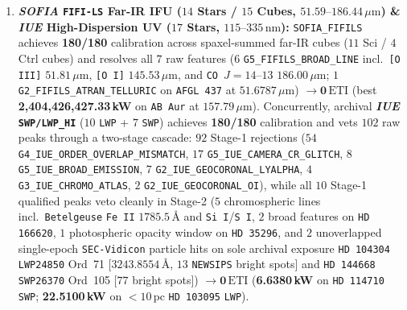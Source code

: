 \documentclass[twocolumn,10pt]{article}
\begin{document}
\begin{enumerate}
  \item \textbf{\textit{SOFIA} \texttt{FIFI-LS} Far-IR IFU ($14$ Stars / $15$ Cubes, $51.59\text{--}186.44\,\mu\text{m}$) \& \textit{IUE} High-Dispersion UV ($17$ Stars, $115\text{--}335\,\text{nm}$):} \texttt{SOFIA\_FIFILS} achieves \textbf{180/180} calibration across spaxel-summed far-IR cubes ($11$ Sci / $4$ Ctrl cubes) and resolves all $7$ raw features ($6$ \texttt{G5\_\allowbreak FIFILS\_\allowbreak BROAD\_\allowbreak LINE} incl.\ \texttt{{[}O III{]}} $51.81\,\mu\text{m}$, \texttt{{[}O I{]}} $145.53\,\mu\text{m}$, and \texttt{CO}\ $J=14\text{--}13$ $186.00\,\mu\text{m}$; $1$ \texttt{G2\_\allowbreak FIFILS\_\allowbreak ATRAN\_\allowbreak TELLURIC} on \texttt{AFGL\,437} at $51.6787\,\mu\text{m}$) $\rightarrow \mathbf{0\,\mathrm{ETI}}$ (best \textbf{2,404,426,427.33\,kW} on \texttt{AB\,Aur} at $157.79\,\mu\text{m}$). Concurrently, archival \textbf{\textit{IUE} \texttt{SWP/LWP\_HI}} ($10$ \texttt{LWP} + $7$ \texttt{SWP}) achieves \textbf{180/180} calibration and vets $102$ raw peaks through a two-stage cascade: $92$ Stage-1 rejections ($54$ \texttt{G4\_\allowbreak IUE\_\allowbreak ORDER\_\allowbreak OVERLAP\_\allowbreak MISMATCH}, $17$ \texttt{G5\_\allowbreak IUE\_\allowbreak CAMERA\_\allowbreak CR\_\allowbreak GLITCH}, $8$ \texttt{G5\_\allowbreak IUE\_\allowbreak BROAD\_\allowbreak EMISSION}, $7$ \texttt{G2\_\allowbreak IUE\_\allowbreak GEOCORONAL\_\allowbreak LYALPHA}, $4$ \texttt{G3\_\allowbreak IUE\_\allowbreak CHROMO\_\allowbreak ATLAS}, $2$ \texttt{G2\_\allowbreak IUE\_\allowbreak GEOCORONAL\_\allowbreak OI}), while all $10$ Stage-1 qualified peaks veto cleanly in Stage-2 ($5$ chromospheric lines incl.\ \texttt{Betelgeuse} \texttt{Fe II} $1785.5\,\text{\AA}$ and \texttt{Si I}/\texttt{S I}, $2$ broad features on \texttt{HD\,166620}, $1$ photospheric opacity window on \texttt{HD\,35296}, and $2$ unoverlapped single-epoch \texttt{SEC-Vidicon} particle hits on sole archival exposure \texttt{HD\,104304} \texttt{LWP24850} Ord~71 [$3243.8554\,\text{\AA}$, $13$ \texttt{NEWSIPS} bright spots] and \texttt{HD\,144668} \texttt{SWP26370} Ord~105 [$77$ bright spots]) $\rightarrow \mathbf{0\,\mathrm{ETI}}$ (\textbf{6.6380\,kW} on \texttt{HD\,114710} \texttt{SWP}; \textbf{22.5100\,kW} on $<10\,\text{pc}$ \texttt{HD\,103095} \texttt{LWP}).

\end{enumerate}
\end{document}
